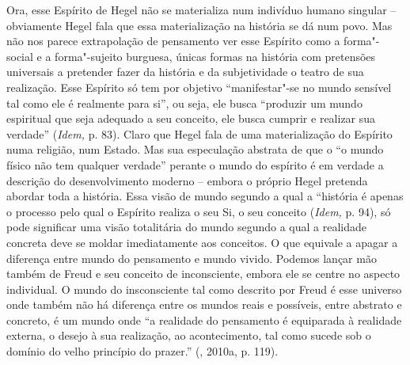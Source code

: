 Ora, esse Espírito de Hegel não se materializa num indivíduo humano
singular -- obviamente Hegel fala que essa materialização na história se
dá num povo. Mas não nos parece extrapolação de pensamento ver esse
Espírito como a forma"-social e a forma"-sujeito burguesa, únicas formas
na história com pretensões universais a pretender fazer da história e da
subjetividade o teatro de sua realização. Esse Espírito só tem por
objetivo ``manifestar"-se no mundo sensível tal como ele é realmente para
si'', ou seja, ele busca ``produzir um mundo espiritual que seja
adequado a seu conceito, ele busca cumprir e realizar sua verdade''
(\emph{Idem,} p. 83). Claro que Hegel fala de uma materialização do
Espírito numa religião, num Estado. Mas sua especulação abstrata de que
o ``o mundo físico não tem qualquer verdade'' perante o mundo do
espírito é em verdade a descrição do desenvolvimento moderno -- embora o
próprio Hegel pretenda abordar toda a história. Essa visão de mundo
segundo a qual a ``história é apenas o processo pelo qual o Espírito
realiza o seu Si, o seu conceito (\emph{Idem,} p. 94), só pode
significar uma visão totalitária do mundo segundo a qual a realidade
concreta deve se moldar imediatamente aos conceitos. O que equivale a
apagar a diferença entre mundo do pensamento e mundo vivido. Podemos
lançar mão também de Freud e seu conceito de inconsciente, embora ele se
centre no aspecto individual. O mundo do insconsciente tal como descrito
por Freud é esse universo onde também não há diferença entre os mundos
reais e possíveis, entre abstrato e concreto, é um mundo onde ``a
realidade do pensamento é equiparada à realidade externa, o desejo à sua
realização, ao acontecimento, tal como sucede sob o domínio do velho
princípio do prazer.'' (, 2010a, p. 119).

